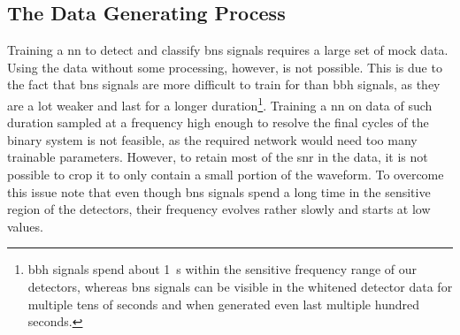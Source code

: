 \subsection{The Data Generating Process}\label{sec:data_generating_process}
Training a \gls{nn} to detect and classify \gls{bns} signals requires a large set of mock data. Using the data without some processing, however, is not possible. This is due to the fact that \gls{bns} signals are more difficult to train for than \gls{bbh} signals, as they are a lot weaker and last for a longer duration\footnote{\gls{bbh} signals spend about \SI{1}{\s} within the sensitive frequency range of our detectors, whereas \gls{bns} signals can be visible in the whitened detector data for multiple tens of seconds \cite{gw170817} and when generated even last multiple hundred seconds.}. Training a \gls{nn} on data of such duration sampled at a frequency high enough to resolve the final cycles of the binary system is not feasible, as the required network would need too many trainable parameters. However, to retain most of the \gls{snr} in the data, it is not possible to crop it to only contain a small portion of the waveform. To overcome this issue note that even though \gls{bns} signals spend a long time in the sensitive region of the detectors, their frequency evolves rather slowly and starts at low values.\\
